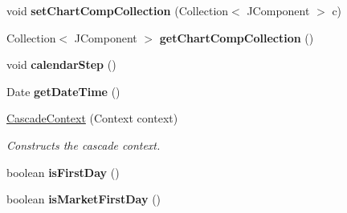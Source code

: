 \begin{DoxyCompactItemize}
\item 
\hypertarget{classuk_1_1ac_1_1dmu_1_1iesd_1_1cascade_1_1context_1_1_cascade_context_ab8b79954dba539eff0cd31177a4f58bc}{void {\bfseries set\-Chart\-Comp\-Collection} (Collection$<$ J\-Component $>$ c)}\label{classuk_1_1ac_1_1dmu_1_1iesd_1_1cascade_1_1context_1_1_cascade_context_ab8b79954dba539eff0cd31177a4f58bc}

\item 
\hypertarget{classuk_1_1ac_1_1dmu_1_1iesd_1_1cascade_1_1context_1_1_cascade_context_a938c7be58cd37a5f7988259ba60fddab}{Collection$<$ J\-Component $>$ {\bfseries get\-Chart\-Comp\-Collection} ()}\label{classuk_1_1ac_1_1dmu_1_1iesd_1_1cascade_1_1context_1_1_cascade_context_a938c7be58cd37a5f7988259ba60fddab}

\item 
\hypertarget{classuk_1_1ac_1_1dmu_1_1iesd_1_1cascade_1_1context_1_1_cascade_context_afc4ae2e38155d4980a43f93cf3812f19}{void {\bfseries calendar\-Step} ()}\label{classuk_1_1ac_1_1dmu_1_1iesd_1_1cascade_1_1context_1_1_cascade_context_afc4ae2e38155d4980a43f93cf3812f19}

\item 
\hypertarget{classuk_1_1ac_1_1dmu_1_1iesd_1_1cascade_1_1context_1_1_cascade_context_a21c95ddf8a275da74418d37795ad9330}{Date {\bfseries get\-Date\-Time} ()}\label{classuk_1_1ac_1_1dmu_1_1iesd_1_1cascade_1_1context_1_1_cascade_context_a21c95ddf8a275da74418d37795ad9330}

\item 
\hyperlink{classuk_1_1ac_1_1dmu_1_1iesd_1_1cascade_1_1context_1_1_cascade_context_ad0ecc85f3491f4d485b6b2323ee52cde}{Cascade\-Context} (Context context)
\begin{DoxyCompactList}\small\item\em Constructs the cascade context. \end{DoxyCompactList}\item 
\hypertarget{classuk_1_1ac_1_1dmu_1_1iesd_1_1cascade_1_1context_1_1_cascade_context_adc0744cd3ca05b0ac204f4d26d0d594c}{boolean {\bfseries is\-First\-Day} ()}\label{classuk_1_1ac_1_1dmu_1_1iesd_1_1cascade_1_1context_1_1_cascade_context_adc0744cd3ca05b0ac204f4d26d0d594c}

\item 
\hypertarget{classuk_1_1ac_1_1dmu_1_1iesd_1_1cascade_1_1context_1_1_cascade_context_a66fda77e740faf0c47c36d2ac3193bf6}{boolean {\bfseries is\-Market\-First\-Day} ()}\label{classuk_1_1ac_1_1dmu_1_1iesd_1_1cascade_1_1context_1_1_cascade_context_a66fda77e740faf0c47c36d2ac3193bf6}


\end{DoxyCompactItemize}
